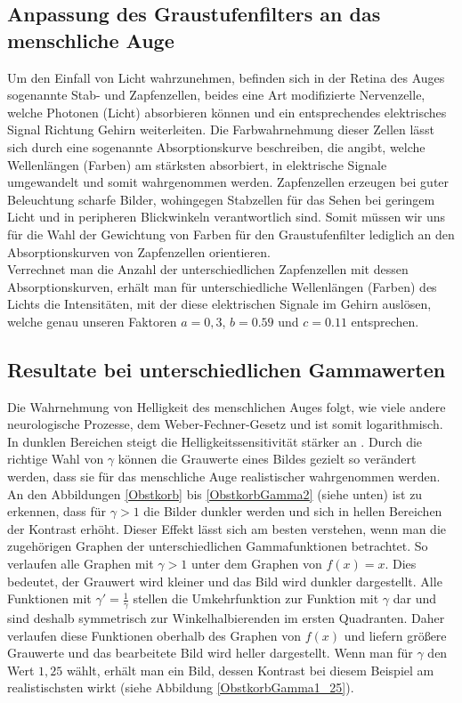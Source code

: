 \documentclass[course=erap]{aspdoc}
\begin{document}
	\subsection{Anpassung des Graustufenfilters an das menschliche Auge}
	Um den Einfall von Licht wahrzunehmen, befinden sich in der Retina des Auges sogenannte Stab- und Zapfenzellen, beides eine Art modifizierte Nervenzelle, welche Photonen (Licht) absorbieren können und ein entsprechendes elektrisches Signal Richtung Gehirn weiterleiten.
	Die Farbwahrnehmung dieser Zellen lässt sich durch eine sogenannte Absorptionskurve beschreiben, die angibt, welche Wellenlängen (Farben) am stärksten absorbiert, in elektrische Signale umgewandelt und somit wahrgenommen werden.
	Zapfenzellen erzeugen bei guter Beleuchtung scharfe Bilder, wohingegen Stabzellen für das Sehen bei geringem Licht und in peripheren Blickwinkeln verantwortlich sind. Somit müssen wir uns für die Wahl der Gewichtung von Farben für den Graustufenfilter lediglich an den Absorptionskurven von Zapfenzellen orientieren.\\
	Verrechnet man die Anzahl der unterschiedlichen Zapfenzellen mit dessen Absorptionskurven, erhält man für unterschiedliche Wellenlängen (Farben) des Lichts die Intensitäten, mit der diese elektrischen Signale im Gehirn auslösen, welche genau unseren Faktoren $a = 0,3$, $b = 0.59$ und $c = 0.11$ entsprechen. \cite{Stab_und_Zapfenzelle}
	
	\subsection{Resultate bei unterschiedlichen Gammawerten}
	Die Wahrnehmung von Helligkeit des menschlichen Auges folgt, wie viele andere neurologische Prozesse, dem Weber-Fechner-Gesetz \cite{weberFechnerGesetz} und ist somit logarithmisch. In dunklen Bereichen steigt die Helligkeitssensitivität stärker an \cite{Logarithmische_Helligkeitswahrnehmung}. Durch die richtige Wahl von $\gamma$ können die Grauwerte eines Bildes gezielt so verändert werden, dass sie für das menschliche Auge realistischer wahrgenommen werden. \\

	\noindent An den Abbildungen \ref{Obstkorb} bis \ref{ObstkorbGamma2} (siehe unten) ist zu erkennen, dass für $\gamma > 1$ die Bilder dunkler werden und sich in hellen Bereichen der Kontrast erhöht. Dieser Effekt lässt sich am besten verstehen, wenn man die zugehörigen Graphen der unterschiedlichen Gammafunktionen betrachtet. So verlaufen alle Graphen mit $\gamma > 1$  unter dem Graphen von $f(x)=x$. Dies bedeutet, der Grauwert wird kleiner und das Bild wird dunkler dargestellt. Alle Funktionen mit $\gamma ' = \frac{1}{\gamma}$ stellen die Umkehrfunktion zur Funktion mit $\gamma$ dar und sind deshalb symmetrisch zur Winkelhalbierenden im ersten Quadranten. Daher verlaufen diese Funktionen oberhalb des Graphen von $f(x)$ und liefern größere Grauwerte und das bearbeitete Bild wird heller dargestellt. Wenn man für $\gamma$ den Wert $1,25$ wählt, erhält man ein Bild, dessen Kontrast bei diesem Beispiel am realistischsten wirkt (siehe Abbildung \ref{ObstkorbGamma1_25}).\\  
	
\end{document}
